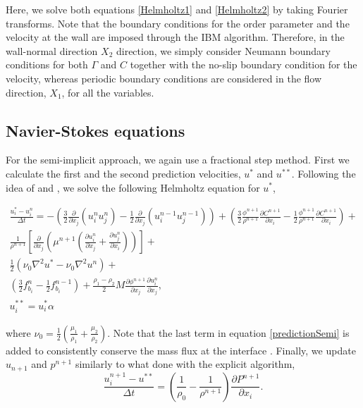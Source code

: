\documentclass[review]{elsarticle}
\begin{document}
Here, we solve both equations \ref{Helmholtz1} and \ref{Helmholtz2} by taking Fourier transforms. Note that the boundary conditions for the order parameter and the 
velocity at the wall are imposed through the IBM algorithm. Therefore, in the wall-normal direction $X_2$ direction, we simply consider Neumann boundary conditions for both $\Gamma$ and $C$ together with the no-slip boundary condition for the velocity, whereas periodic boundary conditions are considered in the flow  direction, $X_1$, for all the variables.

\subsection{Navier-Stokes equations}
For the semi-implicit approach, we again use a fractional step method. First we calculate the first and the second prediction velocities, $u^*$ and $u^{**}$. Following the idea of  \cite{DONG2012} and \cite{DODD2014416}, we solve the following Helmholtz equation for  $u^*$,
\begin{linenomath}\begin{equation} \label{predictionSemi}
\begin{gathered}
\frac{u^*_i-u^n_i}{\Delta t} = -\left( \frac{3}{2} \frac{\partial}{\partial x_j}(u^n_i u^{n}_j)-\frac{1}{2} \frac{\partial}{\partial x_j}(u^{n-1}_i u^{n-1}_j) \right)+
\left(  \frac{3}{2} \frac{\phi^{n+1}}{\rho^{n+1}}\frac{\partial C^{n+1} }{\partial x_i}- \frac{1}{2} \frac{\phi^{n+1}}{\rho^{n+1}}\frac{\partial C^{n+1} }{\partial x_i}    \right)+\\
\frac{1}{\rho^{n+1}}\left[ \frac{\partial}{\partial x_j}\left(\mu^{n+1}(\frac{\partial u^n_i}{\partial x_j}+\frac{\partial u^n_j}{\partial x_i})  \right) \right] +\\
\frac{1}{2} \left(\nu_0 \nabla^2 u^*-\nu_0 \nabla^2 u^n \right)+\\
\left( \frac{3}{2}  f^n_{b_i}-\frac{1}{2}  f^{n-1}_{b_i} \right)+\frac{\rho_1-\rho_2}{2}M\frac{\partial \phi^{n+1}}{\partial x_j}\frac{\partial u_i^n}{\partial x_j},\\
u^{**}_i = u^{*}_i \alpha
 \end{gathered}
\end{equation}\end{linenomath}
 where $\nu_0 = \frac{1}{2} \left( \frac{\mu_1}{\rho_1}+\frac{\mu_2}{\rho_2} \right)$. Note that the last term in equation \ref{predictionSemi} is added to consistently conserve the mass flux at the interface  \cite[see][for a detailed discussion]{HUANG2020109192}.
Finally, we update $u_{n+1}$ and $p^{n+1}$ similarly to what done with the explicit algorithm,
\begin{equation} \label{Correction}
\frac{u_i^{n+1}-u^{**}}{\Delta t} = (\frac{1}{\rho_0}-\frac{1}{\rho^{n+1}})\frac{\partial P^{n+1}}{\partial x_i}.
\end{equation}
\end{document}

